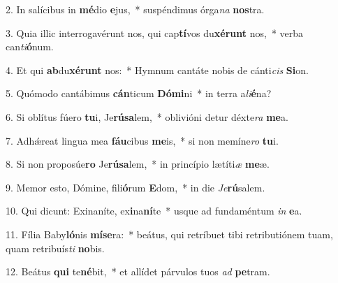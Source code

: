 2. In salícibus in \textbf{mé}dio \textbf{e}jus,~*  suspéndimus órga\textit{na} \textbf{nos}tra.\

3. Quia illic interrogavérunt nos, qui cap\textbf{tí}vos du\textbf{xé}\textbf{runt} nos,~*  verba can\textit{ti}\textbf{ó}num.\

4. Et qui \textbf{ab}du\textbf{xé}\textbf{runt} nos:~*  Hymnum cantáte nobis de cánti\textit{cis} \textbf{Si}on.\

5. Quómodo cantábimus \textbf{cán}ticum \textbf{Dó}\textbf{mi}ni~*  in terra a\textit{li}\textbf{é}na?\

6. Si oblítus fúero \textbf{tu}i, Je\textbf{rú}\textbf{sa}lem,~*  oblivióni detur déxte\textit{ra} \textbf{me}a.\

7. Adhǽreat lingua mea \textbf{fáu}cibus \textbf{me}is,~*  si non memíne\textit{ro} \textbf{tu}i.\

8. Si non proposúe\textbf{ro} Je\textbf{rú}\textbf{sa}lem,~*  in princípio lætíti\textit{æ} \textbf{me}æ.\

9. Memor esto, Dómine, fili\textbf{ó}rum \textbf{E}dom,~*  in die \textit{Je}\textbf{rú}salem.\

10. Qui dicunt: Exinaníte, ex\textbf{i}na\textbf{ní}te~*  usque ad fundaméntum \textit{in} \textbf{e}a.\

11. Fília Baby\textbf{ló}nis \textbf{mí}\textbf{se}ra:~*  beátus, qui retríbuet tibi retributiónem tuam, quam retribuís\textit{ti} \textbf{no}bis.\

12. Beátus \textbf{qui} te\textbf{né}bit,~*  et allídet párvulos tuos \textit{ad} \textbf{pe}tram.\

